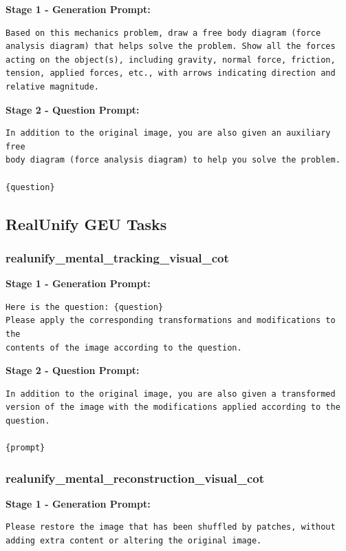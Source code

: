 \documentclass{article}
\theoremstyle{plain}
\theoremstyle{definition}
\theoremstyle{remark}
\begin{document}
\textbf{Stage 1 - Generation Prompt:}

\begin{verbatim}
Based on this mechanics problem, draw a free body diagram (force
analysis diagram) that helps solve the problem. Show all the forces
acting on the object(s), including gravity, normal force, friction,
tension, applied forces, etc., with arrows indicating direction and
relative magnitude.
\end{verbatim}

\textbf{Stage 2 - Question Prompt:}

\begin{verbatim}
In addition to the original image, you are also given an auxiliary free
body diagram (force analysis diagram) to help you solve the problem.

{question}
\end{verbatim}

\subsection{RealUnify GEU Tasks}

\subsubsection{realunify\_mental\_tracking\_visual\_cot}

\textbf{Stage 1 - Generation Prompt:}

\begin{verbatim}
Here is the question: {question}
Please apply the corresponding transformations and modifications to the
contents of the image according to the question.
\end{verbatim}

\textbf{Stage 2 - Question Prompt:}

\begin{verbatim}
In addition to the original image, you are also given a transformed
version of the image with the modifications applied according to the
question.

{prompt}
\end{verbatim}

\subsubsection{realunify\_mental\_reconstruction\_visual\_cot}

\textbf{Stage 1 - Generation Prompt:}

\begin{verbatim}
Please restore the image that has been shuffled by patches, without
adding extra content or altering the original image.
\end{verbatim}
\end{document}
